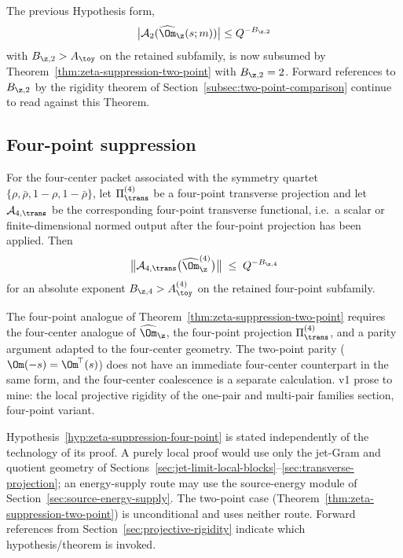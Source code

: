 \begin{remark}
\label{subsec:two-point-suppression-old-statement}
The previous Hypothesis form,
\[
        \bigl|\mathcal A_2(\widehat\Om_\z(s;m))\bigr|\le Q^{-B_{\z,2}}
\]
with \(B_{\z,2}>A_\toy\) on the retained subfamily, is now subsumed by
Theorem~\ref{thm:zeta-suppression-two-point} with \(B_{\z,2}=2\).
Forward references to \(B_{\z,2}\) by the rigidity theorem of
Section~\ref{subsec:two-point-comparison} continue to read against
this Theorem.
\end{remark}

\subsection{Four-point suppression}
\label{subsec:four-point-suppression}

\begin{hypothesis}
\label{hyp:zeta-suppression-four-point}
For the four-center packet associated with the symmetry quartet
\(\{\rho,\bar\rho,1-\rho,1-\bar\rho\}\), let
\(\Pi_\trans^{(4)}\) be a four-point transverse projection and let
\(\mathcal A_{4,\trans}\) be the corresponding four-point transverse
functional, i.e.\ a scalar or finite-dimensional normed output after
the four-point projection has been applied.  Then
\begin{equation}
\label{eq:zeta-suppression-four-point-transverse}
        \bigl\|\mathcal A_{4,\trans}\bigl(\widehat\Om_\z^{(4)}\bigr)\bigr\|
        \;\le\; Q^{-B_{\z,4}}
\end{equation}
for an absolute exponent \(B_{\z,4}>A_\toy^{(4)}\) on the retained
four-point subfamily.
\end{hypothesis}

\begin{wip}\label{rem:wip-zeta-suppression-four-point}
The four-point analogue of
Theorem~\ref{thm:zeta-suppression-two-point} requires the four-center
analogue of \(\widehat\Om_\z\), the four-point projection
\(\Pi_\trans^{(4)}\), and a parity argument adapted to the four-center
geometry.  The two-point parity (\(\Om(-s)=\Om^{\!\top}(s)\)) does not
have an immediate four-center counterpart in the same form, and the
four-center coalescence is a separate calculation.  v1 prose to mine:
the local projective rigidity of the one-pair and multi-pair families
section, four-point variant.
\end{wip}

\begin{remark}
\label{rem:standalone-and-energy-supply-routes}
Hypothesis~\ref{hyp:zeta-suppression-four-point} is stated independently
of the technology of its proof.  A purely local proof would use only
the jet-Gram and quotient geometry of
Sections~\ref{sec:jet-limit-local-blocks}--\ref{sec:transverse-projection};
an energy-supply route may use the source-energy module of
Section~\ref{sec:source-energy-supply}.  The two-point case
(Theorem~\ref{thm:zeta-suppression-two-point}) is unconditional and
uses neither route.  Forward references from
Section~\ref{sec:projective-rigidity} indicate which
hypothesis/theorem is invoked.
\end{remark}


